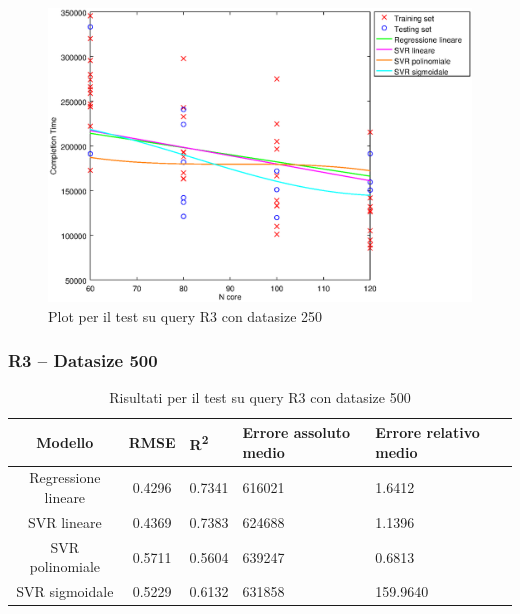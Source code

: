 \documentclass[a4paper,11pt]{article}
\begin{document}
\begin {figure}[hbtp]
\centering
\includegraphics[width=\textwidth]{output/R3_250/plot_R3_250.eps}
\caption {Plot per il test su query R3 con datasize 250}
\end {figure}
\newpage
\subsubsection{R3 -- Datasize 500}
\begin{table}[bhpt]
	\centering
	\begin{adjustbox}{center}
		\begin{tabular}{c | c M{1cm} M{2.5cm} M{2.5cm} M{1.8cm}}
			Modello & RMSE & R\textsuperscript{2} & Errore assoluto medio & Errore relativo medio \tabularnewline
			\hline
			Regressione lineare & 0.4296 & 0.7341 & 616021 & 1.6412 \\
			SVR lineare & 0.4369 & 0.7383 & 624688 & 1.1396 \\
			SVR polinomiale & 0.5711 & 0.5604 & 639247 & 0.6813 \\
			SVR sigmoidale & 0.5229 & 0.6132 & 631858 & 159.9640 \\
		\end{tabular}
	\end{adjustbox}
	\\
	\caption{Risultati per il test su query R3 con datasize 500}
	\label{table_R3_500}
\end{table}
\end{document}
